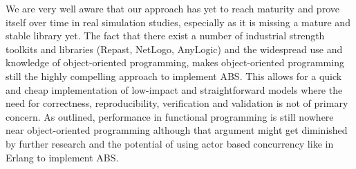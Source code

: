 We are very well aware that our approach has yet to reach maturity and prove itself over time in real simulation studies, especially as it is missing a mature and stable library yet. The fact that there exist a number of industrial strength toolkits and libraries (Repast, NetLogo, AnyLogic) and the widespread use and knowledge of object-oriented programming, makes object-oriented programming still the highly compelling approach to implement ABS. This allows for a quick and cheap implementation of low-impact and straightforward models where the need for correctness, reproducibility, verification and validation is not of primary concern. As outlined, performance in functional programming is still nowhere near object-oriented programming although that argument might get diminished by further research and the potential of using actor based concurrency like in Erlang to implement ABS. %